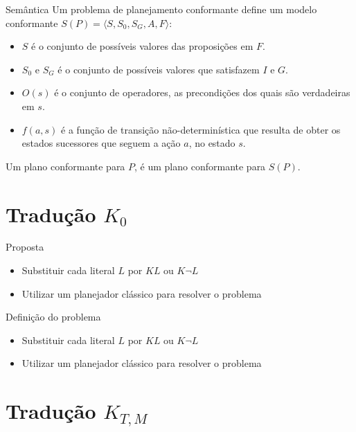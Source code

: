 \begin{frame}{Semântica}
Um problema de planejamento conformante define um modelo conformante $S(P) = 
\langle S, S_0, S_G, A, F\rangle$:
\begin{itemize}
\item $S$ é o conjunto de possíveis valores das proposições em $F$.
\item $S_0$ e $S_G$ é o conjunto de possíveis valores que satisfazem $I$ e $G$.
\item $O(s)$ é o conjunto de operadores, as precondições dos quais são 
verdadeiras em $s$.
\item $f(a,s)$ é a função de transição não-determinística que resulta de obter 
os estados sucessores que seguem a ação $a$, no estado $s$.
\end{itemize}
Um plano conformante para $P$, é um plano conformante para $S(P)$.
\end{frame}


\section{Tradução $K_0$}

\begin{frame}{Proposta}
    \begin{itemize}
    \item Substituir cada literal $L$ por $ KL$ ou $K \lnot L$
    \item Utilizar um planejador clássico para resolver o problema
    \end{itemize}  
\end{frame}

\begin{frame}{Definição do problema }
    \begin{itemize}
    \item Substituir cada literal $L$ por $ KL$ ou $K \lnot L$
    \item Utilizar um planejador clássico para resolver o problema
    \end{itemize}  
\end{frame}

\section{Tradução $K_{T,M}$}



